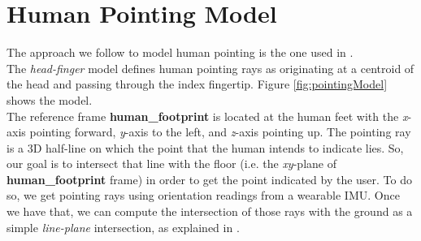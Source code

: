 \section{Human Pointing Model} \label{sec:1.2}
The approach we follow to model human pointing is the one used in \cite{gromov2018robot}. \\
The \emph{head-finger} model defines human pointing rays as originating at a centroid of the head and passing through the index fingertip. Figure \ref{fig:pointingModel} shows the model. \\
The reference frame \textbf{human\_footprint} is located at the human feet with the \emph{x}-axis pointing forward, \emph{y}-axis to the left, and \emph{z}-axis pointing up. The pointing ray is a 3D half-line on which the point that the human intends to indicate lies. So, our goal is to intersect that line with the floor (i.e. the \emph{xy}-plane of \textbf{human\_footprint} frame) in order to get the point indicated by the user. To do so, we get pointing rays using orientation readings from a wearable IMU. Once we have that, we can compute the intersection of those rays with the ground as a simple \emph{line-plane} intersection, as explained in \cite{O'Rourke:1998:CGC:289380}.
\\

